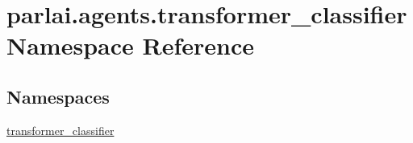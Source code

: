 \hypertarget{namespaceparlai_1_1agents_1_1transformer__classifier}{}\section{parlai.\+agents.\+transformer\+\_\+classifier Namespace Reference}
\label{namespaceparlai_1_1agents_1_1transformer__classifier}
\subsection*{Namespaces}
\begin{DoxyCompactItemize}
\item 
 \hyperlink{namespaceparlai_1_1agents_1_1transformer__classifier_1_1transformer__classifier}{transformer\+\_\+classifier}
\end{DoxyCompactItemize}
